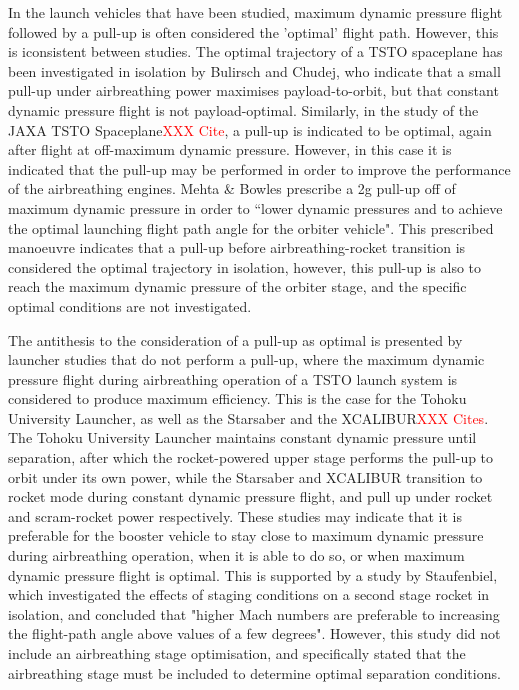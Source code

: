 In the launch vehicles that have been studied, maximum dynamic pressure flight followed by a pull-up is often considered the 'optimal' flight path. However, this is iconsistent between studies. 
The optimal trajectory of a TSTO spaceplane has been investigated in isolation by Bulirsch and Chudej\cite{Bulirsch1995}, who indicate that a small pull-up under airbreathing power maximises payload-to-orbit, but that constant dynamic pressure flight is not payload-optimal. Similarly, in the study of the JAXA TSTO Spaceplane\textcolor{red}{XXX Cite}, a pull-up is indicated to be optimal, again after flight at off-maximum dynamic pressure. However, in this case it is indicated that the pull-up may be performed in order to improve the performance of the airbreathing engines. 
Mehta \& Bowles\cite{Mehta2001} prescribe a 2g pull-up off of maximum dynamic pressure in order to ``lower dynamic pressures and to achieve the optimal launching flight path angle for the orbiter vehicle". This prescribed manoeuvre indicates that a pull-up before airbreathing-rocket transition is considered the optimal trajectory in isolation, however, this pull-up is also to reach the maximum dynamic pressure of the orbiter stage, and the specific optimal conditions are not investigated. 

The antithesis to the consideration of a pull-up as optimal is presented by launcher studies that do not perform a pull-up, where the maximum dynamic pressure flight during airbreathing operation of a TSTO launch system is considered to produce maximum efficiency. 
 This is the case for the Tohoku University Launcher, as well as the Starsaber and the XCALIBUR\textcolor{red}{XXX Cites}. The Tohoku University Launcher maintains constant dynamic pressure until separation, after which the rocket-powered upper stage performs the pull-up to orbit under its own power, while the Starsaber and XCALIBUR transition to rocket mode during constant dynamic pressure flight, and pull up under rocket and scram-rocket power respectively. These studies may indicate that it is preferable for the booster vehicle to stay close to maximum dynamic pressure during airbreathing operation, when it is able to do so, or when maximum dynamic pressure flight is optimal. This is supported by a study by Staufenbiel\cite{Staufenbiel2000}, which investigated the effects of staging conditions on a second stage rocket in isolation, and concluded that "higher Mach numbers are preferable to increasing the flight-path angle above values of a few degrees". However, this study did not include an airbreathing stage optimisation, and specifically stated that the airbreathing stage must be included to determine optimal separation conditions\cite{Staufenbiel2000}. 


